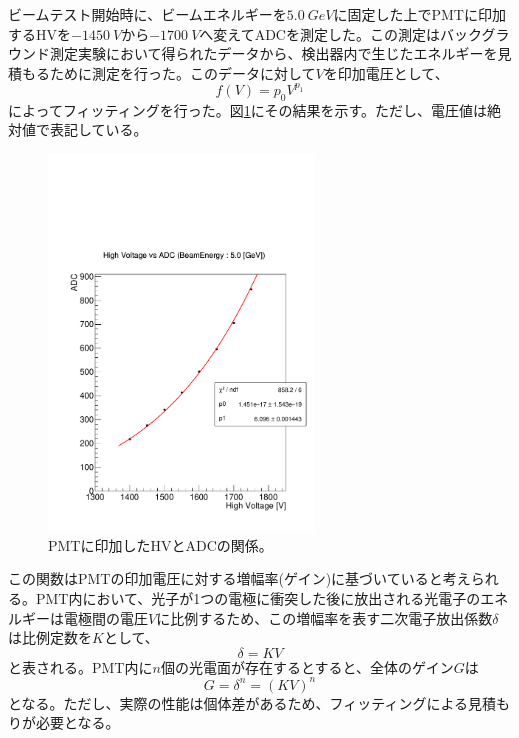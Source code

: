 ビームテスト開始時に、ビームエネルギーを$\SI{5.0}{GeV}$に固定した上でPMTに印加するHVを$\SI{-1450}{V}$から$\SI{-1700}{V}$へ変えてADCを測定した。この測定はバックグラウンド測定実験において得られたデータから、検出器内で生じたエネルギーを見積もるために測定を行った。このデータに対して$V$を印加電圧として、
\begin{equation}
f(V) = p_0 V^{p_1}
\end{equation}
によってフィッティングを行った。図\ref{HVscan}にその結果を示す。ただし、電圧値は絶対値で表記している。

\begin{figure}[H]
	\begin{center}
		\includegraphics[width=200pt]{./Figure/EBESAnalysis/HVscan.pdf}
		\caption[PMTに印加したHVとADCの関係]{PMTに印加したHVとADCの関係。}
		\label{HVscan}
	\end{center}
\end{figure}

この関数はPMTの印加電圧に対する増幅率(ゲイン)に基づいていると考えられる。PMT内において、光子が1つの電極に衝突した後に放出される光電子のエネルギーは電極間の電圧$V$に比例するため、この増幅率を表す二次電子放出係数$\delta$は比例定数を$K$として、
\begin{equation}
\delta = KV
\end{equation}
と表される。PMT内に$n$個の光電面が存在するとすると、全体のゲイン$G$は
\begin{equation}
G=\delta^n=(KV)^n
\end{equation}
となる。ただし、実際の性能は個体差があるため、フィッティングによる見積もりが必要となる。

